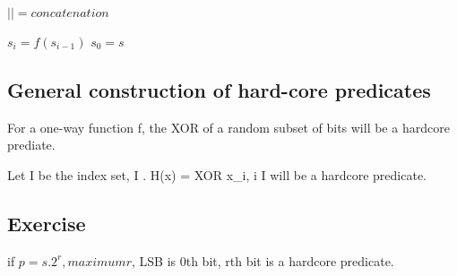 $|| = concatenation$

$s_i = f(s_{i - 1})$
$s_0 = s$


\subsection{General construction of hard-core predicates}

For a one-way function f, the XOR of a random subset of bits will be a hardcore
prediate.

Let I be the index set, I \subset [1..n]. H(x) = XOR x_i, i \in I
will be a hardcore predicate.


\subsection{Exercise}
if $p = s.2^r, maximum r$, LSB is 0th bit, rth bit is a hardcore predicate.
